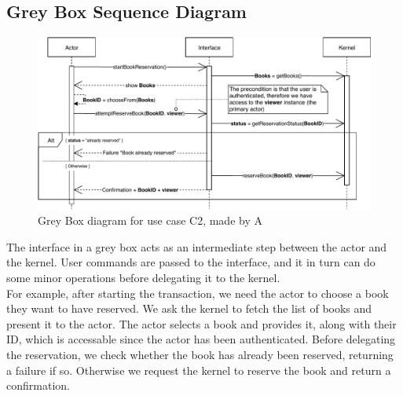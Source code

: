 \subsection*{Grey Box Sequence Diagram}
\begin{figure}[H]
	\centering
	\includegraphics[scale=.9]{uml/SD-gb-reserve.pdf}
	\caption*{Grey Box diagram for use case C2, made by A}
\end{figure}
The interface in a grey box acts as an intermediate step between the actor and the kernel. User commands are passed to the interface, and it in turn can do some minor operations before delegating it to the kernel.\\For example, after starting the transaction, we need the actor to choose a book they want to have reserved. We ask the kernel to fetch the list of books and present it to the actor. The actor selects a book and provides it, along with their ID, which is accessable since the actor has been authenticated. Before delegating the reservation, we check whether the book has already been reserved, returning a failure if so. Otherwise we request the kernel to reserve the book and return a confirmation.
